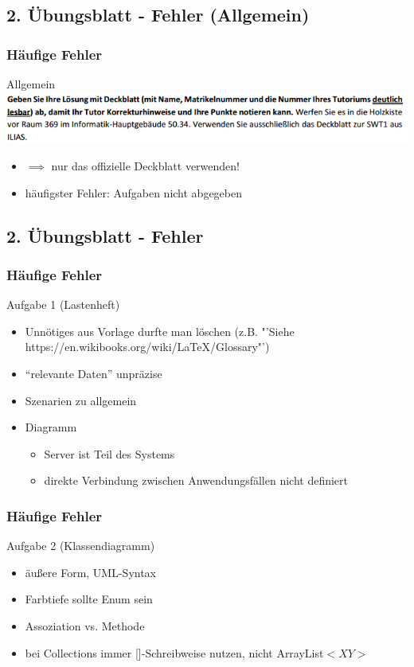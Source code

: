 \documentclass[18pt]{beamer}
\begin{document}
	
	\subsection{2. Übungsblatt - Fehler (Allgemein)}
	\begin{frame}
		\frametitle{Häufige Fehler}
		\begin{block}{Allgemein}
			\includegraphics[scale=0.6]{./pics/tut2/deckblatt.png}
			\begin{itemize}
				\item $\implies$ nur das offizielle Deckblatt verwenden!
				\pause
				\item häufigster Fehler: Aufgaben nicht abgegeben
			\end{itemize}
		\end{block}
	\end{frame}
	
	\subsection{2. Übungsblatt - Fehler}
	\begin{frame}
		\frametitle{Häufige Fehler}
		\begin{block}{Aufgabe 1 (Lastenheft)}
			\begin{itemize}
				\item Unnötiges aus Vorlage durfte man löschen (z.B. "'Siehe https://en.wikibooks.org/wiki/LaTeX/Glossary"')
				\pause
				\item \enquote{relevante Daten} unpräzise
				\pause
				\item Szenarien zu allgemein
				\pause
				\item Diagramm
				\begin{itemize}
					\item Server ist Teil des Systems
					\item direkte Verbindung zwischen Anwendungsfällen nicht definiert
				\end{itemize}
			\end{itemize}
		\end{block}
	\end{frame}

	\begin{frame}
		\frametitle{Häufige Fehler}
		\begin{block}{Aufgabe 2 (Klassendiagramm)}
			\begin{itemize}
				\item äußere Form, UML-Syntax
				\pause
				\item Farbtiefe sollte Enum sein
				\pause
				\item Assoziation vs. Methode
				\pause
				\item bei Collections immer []-Schreibweise nutzen, nicht ArrayList$<XY>$
			\end{itemize}
		\end{block}
	\end{frame}
\end{document}
